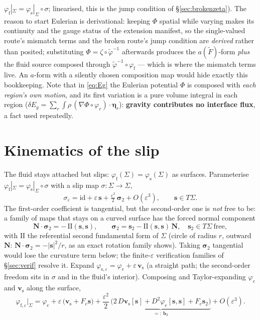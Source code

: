 \documentclass[11pt]{article}
\newcommand{\eps}{\varepsilon}
\newcommand{\bN}{\mathbf{N}}
\newcommand{\bs}{\mathbf{s}}
\newcommand{\bv}{\mathbf{v}}
\begin{document}
$\varphi_{\mathrm{f}}|_\Sigma = \varphi_{\mathrm{s}}|_\Sigma\circ\sigma$;
linearised, this is the jump condition of \S\ref{sec:brokenzeta}). The reason to start Eulerian is derivational: keeping $\Phi$
spatial while varying makes its continuity and the gauge status of
the extension manifest, so the single-valued route's mismatch terms
and the broken route's jump condition are \emph{derived} rather than
posited; substituting $\Phi = \zeta\circ\tilde\varphi^{-1}$ afterwards
produces the $a(\tilde F)$-form \emph{plus} the fluid source composed
through $\tilde\varphi^{-1}\circ\varphi_{\mathrm{f}}$ --- which is
where the mismatch terms live. An $a$-form with a silently chosen
composition map would hide exactly this bookkeeping. Note that
in \eqref{eq:Eg} the Eulerian potential $\Phi$ is composed with
\emph{each region's own motion}, and its first variation is a pure
volume integral in each region
($\delta E_g = \sum_r \int \rho\, (\nabla\Phi\circ\varphi_r)\cdot
\bm{\eta}_r$): \textbf{gravity contributes no interface flux}, a fact
used repeatedly.

\section{Kinematics of the slip}
\label{sec:kin}

The fluid stays attached but slips:
$\varphi_{\mathrm{f}}(\Sigma) = \varphi_{\mathrm{s}}(\Sigma)$ as
surfaces. Parameterise
$\varphi_{\mathrm{f}}|_\Sigma = \varphi_{\mathrm{s}}|_\Sigma \circ
\sigma$ with a slip map $\sigma : \Sigma \to \Sigma$,
\begin{equation}
  \sigma_\eps = \mathrm{id} + \eps\,\bs + \tfrac{\eps^2}{2}\,\bm{\sigma}_2
  + O(\eps^3),
  \qquad \bs \in T\Sigma .
\end{equation}
The first-order coefficient is tangential, but the second-order one is
\emph{not} free to be: a family of maps that stays on a curved surface
has the forced normal component
\begin{equation}
  \bN\cdot\bm{\sigma}_2 = -\,\mathrm{II}(\bs, \bs),
  \qquad
  \bm{\sigma}_2 = \bs_2 - \mathrm{II}(\bs,\bs)\,\bN,
  \quad \bs_2 \in T\Sigma \ \text{free},
  \label{eq:sigma2}
\end{equation}
with $\mathrm{II}$ the referential second fundamental form of $\Sigma$
(circle of radius $r$, outward $\bN$: $\bN\cdot\bm{\sigma}_2 =
-|\bs|^2/r$, as an exact rotation family shows). Taking
$\bm{\sigma}_2$ tangential would lose the curvature term below; the
finite-$\eps$ verification families of \S\ref{sec:verif} resolve it.
Expand $\varphi_{\mathrm{s},\eps} = \varphi_e + \eps\,\bv_{\mathrm{s}}$
(a straight path; the second-order freedom sits in $\sigma$ and in the
fluid's interior). Composing and Taylor-expanding $\varphi_e$ and
$\bv_{\mathrm{s}}$ along the surface,
\begin{equation}
  \varphi_{\mathrm{f},\eps}\big|_\Sigma
  = \varphi_e
  + \eps\,\bigl(\bv_{\mathrm{s}} + F_e \bs\bigr)
  + \frac{\eps^2}{2}\,\underbrace{\bigl(
      2\,D\bv_{\mathrm{s}}[\bs] + D^2\varphi_e[\bs,\bs] + F_e \bs_2
    \bigr)}_{=:\ \mathbf{b}_2} + O(\eps^3).
  \label{eq:expand}
\end{equation}
\end{document}
